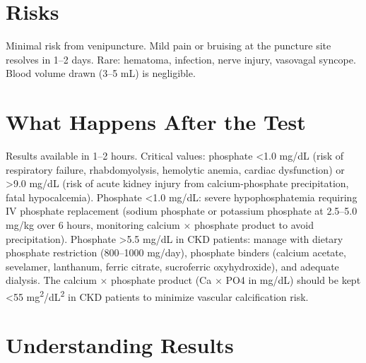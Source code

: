 \section*{Risks}
Minimal risk from venipuncture. Mild pain or bruising at the puncture site resolves in 1--2 days. Rare: hematoma, infection, nerve injury, vasovagal syncope. Blood volume drawn (3--5 mL) is negligible.

\section*{What Happens After the Test}
Results available in 1--2 hours. Critical values: phosphate <1.0 mg/dL (risk of respiratory failure, rhabdomyolysis, hemolytic anemia, cardiac dysfunction) or >9.0 mg/dL (risk of acute kidney injury from calcium-phosphate precipitation, fatal hypocalcemia). Phosphate <1.0 mg/dL: severe hypophosphatemia requiring IV phosphate replacement (sodium phosphate or potassium phosphate at 2.5--5.0 mg/kg over 6 hours, monitoring calcium $\times$ phosphate product to avoid precipitation). Phosphate >5.5 mg/dL in CKD patients: manage with dietary phosphate restriction (800--1000 mg/day), phosphate binders (calcium acetate, sevelamer, lanthanum, ferric citrate, sucroferric oxyhydroxide), and adequate dialysis. The calcium $\times$ phosphate product (Ca $\times$ PO4 in mg/dL) should be kept <55 mg\textsuperscript{2}/dL\textsuperscript{2} in CKD patients to minimize vascular calcification risk.

\section*{Understanding Results}

